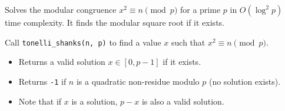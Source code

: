 
Solves the modular congruence $x^2 \equiv n \pmod p$ for a prime $p$ in $O(\log^2 p)$ time complexity. It finds the modular square root if it exists.



Call \lstinline|tonelli_shanks(n, p)| to find a value $x$ such that $x^2 \equiv n \pmod p$. 
\begin{itemize}
    \item Returns a valid solution $x \in [0, p-1]$ if it exists.
    \item Returns \lstinline|-1| if $n$ is a quadratic non-residue modulo $p$ (no solution exists).
    \item Note that if $x$ is a solution, $p - x$ is also a valid solution.
\end{itemize}
